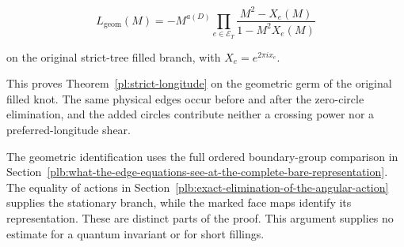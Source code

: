 \begin{equation}\label{plb:24}
L_{\mathrm{geom}}(M)
   =-M^{a(D)}
      \prod_{e\in\mathcal E_T}
                \frac{M^2-X_e(M)}{1-M^2X_e(M)}
\end{equation}

on the original strict-tree filled branch, with \(X_e=e^{2\pi ix_e}\).

This proves Theorem~\ref{pl:strict-longitude} on the geometric germ of the original
filled knot. The same physical edges occur before and after the
zero-circle elimination, and the added circles contribute neither
a crossing power nor a preferred-longitude shear.

The geometric identification uses the full ordered boundary-group
comparison in Section~\ref{plb:what-the-edge-equations-see-at-the-complete-bare-representation}. The equality of actions in Section~\ref{plb:exact-elimination-of-the-angular-action} supplies
the stationary branch, while the marked face maps identify its
representation. These are distinct parts of the proof. This argument supplies no estimate for a quantum invariant or for short fillings.

